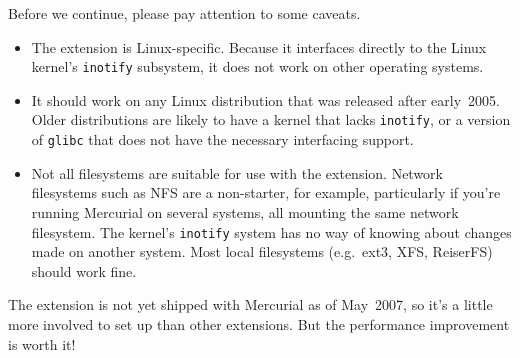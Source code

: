 Before we continue, please pay attention to some caveats.
\begin{itemize}
\item The  extension is Linux-specific.  Because it
  interfaces directly to the Linux kernel's \texttt{inotify}
  subsystem, it does not work on other operating systems.
\item It should work on any Linux distribution that was released after
  early~2005.  Older distributions are likely to have a kernel that
  lacks \texttt{inotify}, or a version of \texttt{glibc} that does not
  have the necessary interfacing support.
\item Not all filesystems are suitable for use with the
   extension.  Network filesystems such as NFS are a
  non-starter, for example, particularly if you're running Mercurial
  on several systems, all mounting the same network filesystem.  The
  kernel's \texttt{inotify} system has no way of knowing about changes
  made on another system.  Most local filesystems (e.g.~ext3, XFS,
  ReiserFS) should work fine.
\end{itemize}

The  extension is not yet shipped with Mercurial as of
May~2007, so it's a little more involved to set up than other
extensions.  But the performance improvement is worth it!

